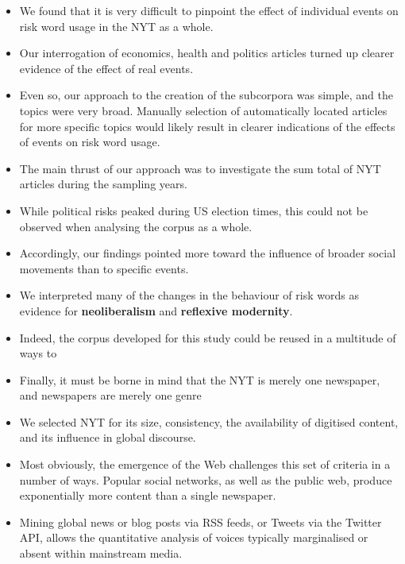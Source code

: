     \begin{itemize}
    \item We found that it is very difficult to pinpoint the effect of individual events on risk word usage in the NYT as a whole.
        \item Our interrogation of economics, health and politics articles turned up clearer evidence of the effect of real events.
        \item Even so, our approach to the creation of the subcorpora was simple, and the topics were very broad. Manually selection of automatically located articles for more specific topics would likely result in clearer indications of the effects of events on risk word usage.
        \item The main thrust of our approach was to investigate the sum total of NYT articles during the sampling years.
        \item While political risks peaked during US election times, this could not be observed when analysing the corpus as a whole.
        \item Accordingly, our findings pointed more toward the influence of broader social movements than to specific events.
        \item We interpreted many of the changes in the behaviour of risk words as evidence for \textbf{neoliberalism} and \textbf{reflexive modernity}.
        \item Indeed, the corpus developed for this study could be reused in a multitude of ways to 
        \item Finally, it must be borne in mind that the NYT is merely one newspaper, and newspapers are merely one genre
        \item We selected NYT for its size, consistency, the availability of digitised content, and its influence in global discourse.
        \item Most obviously, the emergence of the Web challenges this set of criteria in a number of ways. Popular social networks, as well as the public web, produce exponentially more content than a single newspaper.
        \item Mining global news or blog posts via RSS feeds, or Tweets via the Twitter API, allows the quantitative analysis of voices typically marginalised or absent within mainstream media.
    \end{itemize}
    
%